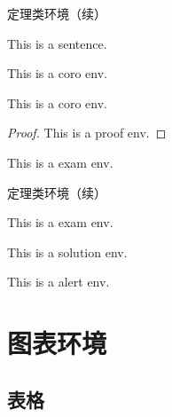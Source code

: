 \documentclass[compress,10pt,dvipsnames,notheorems]{beamer} %
\begin{document}
\begin{frame}{定理类环境（续）}
	\begin{thm}\label{thm:yyy}
		This is a sentence.
	\end{thm}\vspace{\baselineskip}

	\begin{coro}
		This is a coro env.
	\end{coro}\vspace{\baselineskip}

	\begin{coro}
		This is a coro env.
	\end{coro}\vspace{\baselineskip}

	\begin{proof}
		This is a proof env.
	\end{proof}\vspace{\baselineskip}
	
	\begin{exam}
		This is a exam env.
	\end{exam}
\end{frame}

\begin{frame}{定理类环境（续）}
	\begin{exam}\label{exam:zzz}
		This is a exam env.
	\end{exam}\vspace{\baselineskip}
	
	\begin{solu}
		This is a solution env.
	\end{solu}\vspace{\baselineskip}
	
	\begin{alert}
		This is a alert env.
	\end{alert}
\end{frame}


\section{图表环境}%

\subsection{表格}
\end{document}
